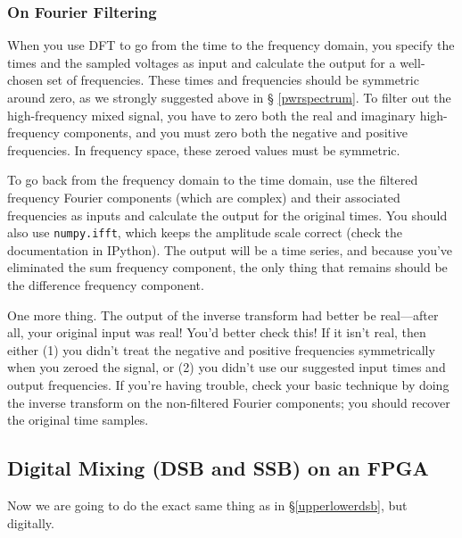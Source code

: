 \documentclass[11pt]{article}
\begin{document}
\subsubsection {On  Fourier Filtering} \label{fourierfilter}

When you use DFT to go from the time to the frequency domain, you
specify the times and the sampled voltages as input and calculate the
output for a well-chosen set of frequencies.  These times and
frequencies should be symmetric around zero, as we strongly suggested above in \S
\ref{pwrspectrum}.  To filter out the high-frequency mixed signal, you
have to zero both the real and imaginary high-frequency components,
and you must zero both the negative and positive frequencies. In
frequency space, these zeroed values must be symmetric.

To go back from the frequency domain to the time domain, use the 
  filtered frequency Fourier components (which are complex) and their associated frequencies
  as inputs and calculate the output for the original times.
  You should also use {\tt numpy.ifft}, which keeps the
  amplitude scale correct (check the documentation in IPython).
  The output will be a time series, and because you've
  eliminated the sum frequency component, the only thing that remains
  should be the difference frequency component.

One more thing. The output of the inverse transform had better be
real---after all, your original input was real! You'd better check this!
If it isn't real, then either (1) you didn't treat the negative and positive
frequencies symmetrically when you zeroed the signal, or (2) you didn't
use our suggested input times and output frequencies. If you're having
trouble, check your basic technique by doing the inverse transform on
the non-filtered Fourier components; you should recover the original
time samples.

\subsection{Digital Mixing (DSB and SSB) on an FPGA} \label{digital_mixing}

Now we are going to do the exact same thing as in \S\ref{upperlowerdsb}, but digitally.
\end{document}
